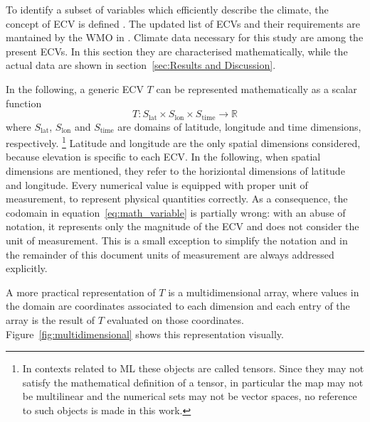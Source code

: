 To identify a subset of variables which efficiently describe the climate, the concept of \gls{ECV} is defined \cite{2014BojinskiTheConcept}. The updated list of \glspl{ECV} and their requirements are mantained by the \gls{WMO} in \cite[14-17]{2022WorldMeteorologicalOrganizationWMOThe2022}.
Climate data necessary for this study are among the present \glspl{ECV}. In this section they are characterised mathematically, while the actual data are shown in section~\ref{sec:Results and Discussion}.

In the following, a generic \gls{ECV} $T$ can be represented mathematically as a scalar function
\begin{equation}
  \label{eq:math_variable}
  T : S_\text{lat} \times S_\text{lon} \times S_\text{time} \to \mathbb{R}
\end{equation}
where $S_\text{lat}$, $S_\text{lon}$ and $S_\text{time}$ are domains of latitude, longitude and time dimensions, respectively.%
\footnote{In contexts related to \gls{ML} these objects are called tensors. Since they may not satisfy the mathematical definition of a tensor, in particular the map may not be multilinear and the numerical sets may not be vector spaces, no reference to such objects is made in this work.}
Latitude and longitude are the only spatial dimensions considered, because elevation is specific to each \gls{ECV}. In the following, when spatial dimensions are mentioned, they refer to the horiziontal dimensions of latitude and longitude.
Every numerical value is equipped with proper unit of measurement, to represent physical quantities correctly. As a consequence, the codomain in equation~\eqref{eq:math_variable} is partially wrong: with an abuse of notation, it represents only the magnitude of the \gls{ECV} and does not consider the unit of measurement. This is a small exception to simplify the notation and in the remainder of this document units of measurement are always addressed explicitly.

A more practical representation of $T$ is a multidimensional array, where values in the domain are coordinates associated to each dimension and each entry of the array is the result of $T$ evaluated on those coordinates. Figure~\ref{fig:multidimensional} shows this representation visually.


